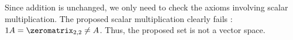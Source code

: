 %
Since addition is unchanged, we only need to check the axioms involving scalar multiplication.  The proposed scalar multiplication clearly fails  :  $1A = \zeromatrix_{2,2}\ne A$.  Thus, the proposed set is not a vector space.